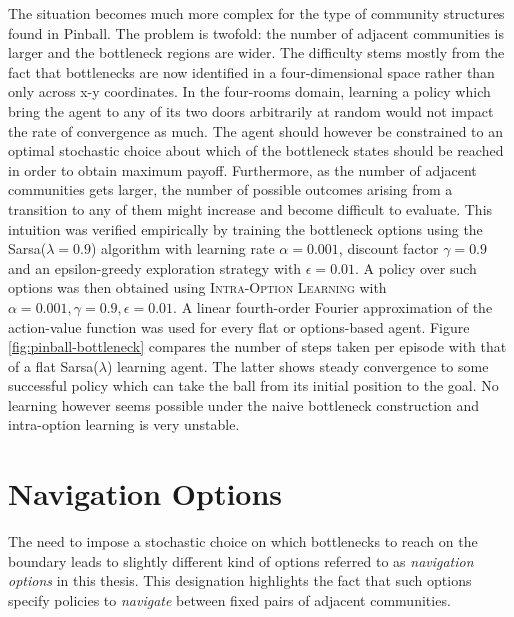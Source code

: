 The situation becomes much more complex for the type of community structures found in Pinball. The problem is twofold: the number of adjacent communities is larger and the bottleneck regions are wider. The difficulty stems mostly from the fact that bottlenecks are now identified in a four-dimensional space rather than only across x-y coordinates. In the four-rooms domain, learning a policy which bring the agent to any of its two doors arbitrarily at random would not impact the rate of convergence as much. The agent should however be constrained to an optimal stochastic choice about which of the bottleneck states should be reached in order to obtain maximum payoff. Furthermore, as the number of adjacent communities gets larger, the number of possible outcomes arising from a transition to any of them might increase and become difficult to evaluate. This intuition was verified empirically by training the bottleneck options using the Sarsa($\lambda = 0.9$) algorithm with learning rate $\alpha = 0.001$, discount factor $\gamma = 0.9$ and an epsilon-greedy exploration strategy with $\epsilon = 0.01$. A policy over such options was then obtained using \textsc{Intra-Option Learning} with $\alpha = 0.001, \gamma = 0.9, \epsilon = 0.01$. A linear fourth-order Fourier approximation of the action-value function was used for every flat or options-based agent. Figure \ref{fig:pinball-bottleneck} compares the number of steps taken per episode with that of a flat Sarsa($\lambda$) learning agent. The latter shows steady convergence to some successful policy which can take the ball from its initial position to the goal. No learning however seems possible under the naive bottleneck construction and intra-option learning is very unstable. 

\section{Navigation Options}

The need to impose a stochastic choice on which bottlenecks to reach on the boundary leads to slightly different kind of options referred to as \textit{navigation options} in this thesis. This designation highlights the fact that such options specify policies to \textit{navigate} between fixed pairs of adjacent communities.

